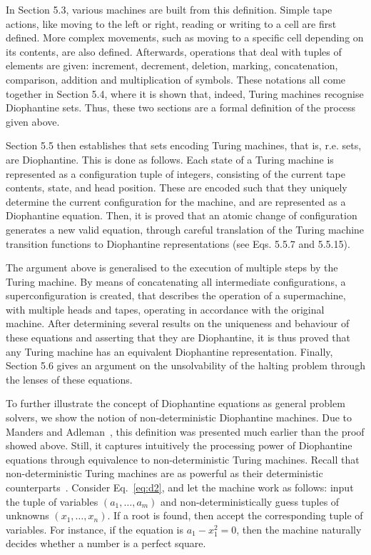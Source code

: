 \documentclass[12pt]{article}
\begin{document}
In Section 5.3, various machines are built from this definition. Simple tape
actions, like moving to the left or right, reading or writing to a cell are
first defined. More complex movements, such as moving to a specific cell
depending on its contents, are also defined. Afterwards, operations that deal
with tuples of elements are given: increment, decrement, deletion, marking,
concatenation, comparison, addition and multiplication of symbols. These
notations all come together in Section 5.4, where it is shown that, indeed,
Turing machines recognise Diophantine sets. Thus, these two sections are a
formal definition of the process given above.

Section 5.5 then establishes that sets encoding Turing machines, that is, r.e.
sets, are Diophantine. This is done as follows. Each state of a Turing machine
is represented as a configuration tuple of integers, consisting of the current
tape contents, state, and head position. These are encoded such that they
uniquely determine the current configuration for the machine, and are
represented as a Diophantine equation. Then, it is proved that an atomic change
of configuration generates a new valid equation, through careful translation of
the Turing machine transition functions to Diophantine representations (see
Eqs. 5.5.7 and 5.5.15).

The argument above is generalised to the execution of multiple steps by the
Turing machine. By means of concatenating all intermediate configurations, a
superconfiguration is created, that describes the operation of a supermachine,
with multiple heads and tapes, operating in accordance with the original
machine. After determining several results on the uniqueness and behaviour of
these equations and asserting that they are Diophantine, it is thus proved that
any Turing machine has an equivalent Diophantine representation. Finally,
Section 5.6 gives an argument on the unsolvability of the halting problem
through the lenses of these equations.

To further illustrate the concept of Diophantine equations as general problem
solvers, we show the notion of non-deterministic Diophantine machines. Due to
Manders and Adleman~\cite[Sec. 3]{Manders:article:1978:apr}, this definition
was presented much earlier than the proof showed above. Still, it captures
intuitively the processing power of Diophantine equations through equivalence
to non-deterministic Turing machines. Recall that non-deterministic Turing
machines are as powerful as their deterministic counterparts~\cite[Theorem
3.16]{Sipser:book:2012}. Consider Eq.~\ref{eq:d2}, and let the machine work as
follows: input the tuple of variables $(a_{1}, \dots, a_{m})$ and
non-deterministically guess tuples of unknowns $(x_{1}, \dots, x_{n})$. If a
root is found, then accept the corresponding tuple of variables. For instance,
if the equation is $a_{1} - x_{1}^{2} = 0$, then the machine naturally decides
whether a number is a perfect square.
\end{document}
